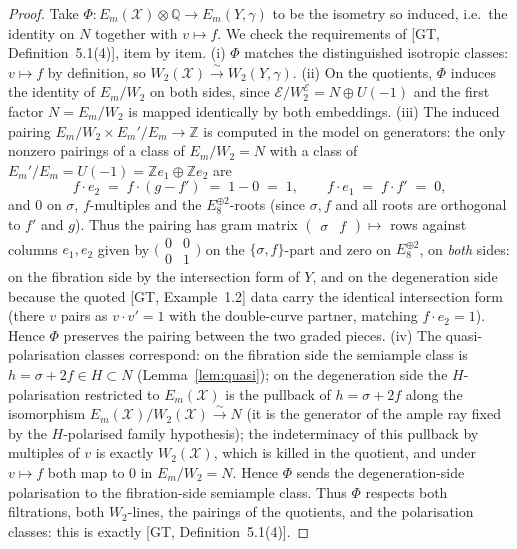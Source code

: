 \documentclass[11pt]{article}
\newcommand{\X}{\mathcal{X}}
\newcommand{\bZ}{\mathbb{Z}}
\newcommand{\bQ}{\mathbb{Q}}
\newcommand{\cE}{\mathcal{E}}
\begin{document}
\begin{proof}
Take $\Phi\colon E_m(\X)\otimes\bQ \to E_m(Y,\gamma)$ to be the isometry
so induced, i.e.\ the identity on $N$ together with $v\mapsto f$. We
check the requirements of [GT, Definition~5.1(4)], item by item.
(i) $\Phi$ matches the distinguished isotropic classes: $v\mapsto f$ by
definition, so $W_2(\X)\xrightarrow{\sim}W_2(Y,\gamma)$. (ii) On the
quotients, $\Phi$ induces the identity of $E_m/W_2$ on both sides,
since $\cE/W_2^{\cE}=N\oplus U(-1)$ and the first factor $N=E_m/W_2$ is
mapped identically by both embeddings. (iii) The induced pairing
$E_m/W_2 \times E_m'/E_m \to \bZ$ is computed in the model on
generators: the only nonzero pairings of a class of $E_m/W_2=N$ with
a class of $E_m'/E_m=U(-1)=\bZ e_1\oplus\bZ e_2$ are
\[
f\cdot e_2 \;=\; f\cdot(g-f') \;=\; 1-0 \;=\; 1,
\qquad
f\cdot e_1 \;=\; f\cdot f' \;=\; 0,
\]
and $0$ on $\sigma$, $f$-multiples and the $E_8^{\oplus2}$-roots (since
$\sigma,f$ and all roots are orthogonal to $f'$ and $g$). Thus the
pairing has gram matrix $\begin{pmatrix}\sigma&f\end{pmatrix}
\mapsto$ rows against columns $e_1,e_2$ given by
$\bigl(\begin{smallmatrix}0&0\\0&1\end{smallmatrix}\bigr)$ on the
$\{\sigma,f\}$-part and zero on $E_8^{\oplus2}$, on \emph{both} sides:
on the fibration side by the intersection form of $Y$, and on the
degeneration side because the quoted [GT, Example~1.2] data carry the
identical intersection form (there $v$ pairs as $v\cdot v'=1$ with the
double-curve partner, matching $f\cdot e_2=1$). Hence $\Phi$ preserves
the pairing between the two graded pieces. (iv) The quasi-polarisation
classes correspond: on the fibration side the semiample class is
$h=\sigma+2f\in H\subset N$ (Lemma~\ref{lem:quasi}); on the degeneration
side the $H$-polarisation restricted to $E_m(\X)$ is the pullback of
$h=\sigma+2f$ along the isomorphism
$E_m(\X)/W_2(\X)\xrightarrow{\sim}N$ (it is the generator of the ample
ray fixed by the $H$-polarised family hypothesis); the indeterminacy of
this pullback by multiples of $v$ is exactly $W_2(\X)$, which is killed
in the quotient, and under $v\mapsto f$ both map to $0$ in
$E_m/W_2=N$. Hence $\Phi$ sends the degeneration-side polarisation to
the fibration-side semiample class. Thus $\Phi$ respects both
filtrations, both $W_2$-lines, the pairings of the quotients, and the
polarisation classes: this is exactly [GT, Definition~5.1(4)].
\end{proof}
\end{document}
